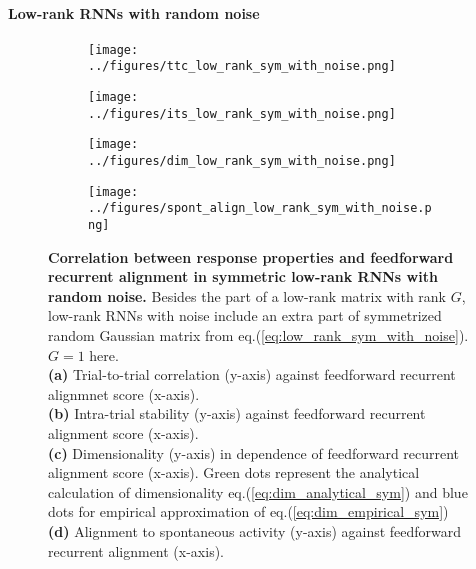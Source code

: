 \documentclass[11pt]{article}
\begin{document}
	\paragraph{Low-rank RNNs with random noise}
		\begin{figure}[H]
			\centering
			\begin{subfigure}[b]{0.45\textwidth}
				\centering
				\texttt{[image: ../figures/ttc\_low\_rank\_sym\_with\_noise.png]}
				\caption{}
			\end{subfigure}
			\hfill
			\begin{subfigure}[b]{0.45\textwidth}
				\centering
				\texttt{[image: ../figures/its\_low\_rank\_sym\_with\_noise.png]}
				\caption{}
			\end{subfigure}
			\newline
			\begin{subfigure}[b]{0.45\textwidth}
				\centering
				\texttt{[image: ../figures/dim\_low\_rank\_sym\_with\_noise.png]}
				\caption{}
			\end{subfigure}
			\hfill
			\begin{subfigure}[b]{0.45\textwidth}
				\centering
				\texttt{[image: ../figures/spont\_align\_low\_rank\_sym\_with\_noise.png]}
				\caption{}
			\end{subfigure}
		\caption[Correlation between response properties and feedforward recurrent alignment in symmetric low-rank RNNs with random noise]{\textbf{Correlation between response properties and feedforward recurrent alignment in symmetric low-rank RNNs with random noise.} Besides the part of a low-rank matrix with rank $G$, low-rank RNNs with noise include an extra part of symmetrized random Gaussian matrix from eq.(\ref{eq:low_rank_sym_with_noise}). $G=1$ here.\\
		\textbf{(a)} Trial-to-trial correlation (y-axis) against feedforward recurrent alignmnet score (x-axis).\\
		\textbf{(b)} Intra-trial stability (y-axis) against feedforward recurrent alignment score (x-axis). \\
		\textbf{(c)} Dimensionality (y-axis) in dependence of feedforward recurrent alignment score (x-axis). Green dots represent the analytical calculation of dimensionality eq.(\ref{eq:dim_analytical_sym}) and blue dots for empirical approximation of eq.(\ref{eq:dim_empirical_sym})\\
		 \textbf{(d)} Alignment to spontaneous activity (y-axis) against feedforward recurrent alignment (x-axis).}
	 	\label{fig:result_sym_low_rank_with_noise}
		\end{figure}
\end{document}
